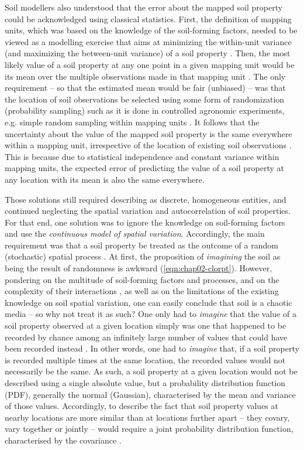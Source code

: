 Soil modellers also understood that the error about the mapped soil property could be acknowledged using 
classical statistics. First, the definition of mapping units, which was based on the knowledge of the 
soil-forming factors, needed to be viewed as a modelling exercise that aims at minimizing the within-unit 
variance (and maximizing the between-unit variance) of a soil property \cite{VoltzEtAl1990}. Then, the most 
likely value of a soil property at any one point in a given mapping unit would be its mean over the multiple 
observations made in that mapping unit \cite{VoltzEtAl1990, Cressie1993}. The only requirement -- so that the 
estimated mean would be fair (unbiased) -- was that the location of soil observations be selected using some 
form of randomization (probability sampling) such as it is done in controlled agronomic experiments, e.g. 
simple random sampling within mapping units \cite{deGruijterEtAl1990}. It follows that the uncertainty about 
the value of the mapped soil property is the same everywhere within a mapping unit, irrespective of the 
location of existing soil observations \cite{Heuvelink1996}. This is because due to statistical independence 
and constant variance within mapping units, the expected error of predicting the value of a soil property at 
any location with its mean is also the same everywhere.

Those solutions still required describing  as discrete, homogeneous entities, and continued 
neglecting the spatial variation and autocorrelation of soil properties. For that end, one solution was to 
ignore the knowledge on soil-forming factors and use the \emph{continuous model of spatial variation}. 
Accordingly, the main requirement was that a soil property be treated as the outcome of a random (stochastic) 
spatial process \cite{Cressie1993, Webster2000}. At first, the proposition of \emph{imagining} the soil as 
being the result of randomness is awkward (\autoref{eqn:chap02-clorpt}). However, pondering on the multitude of 
soil-forming factors and processes, and on the complexity of their interactions \cite{BockheimEtAl2010, 
GrunwaldEtAl2011}, as well as on the limitations of the existing knowledge on soil spatial variation, one can 
easily conclude that soil is a chaotic media \cite{Webster2000} -- so why not treat it as such? One only had to 
\emph{imagine} that the value of a soil property observed at a given location simply was one that happened to 
be recorded by chance among an infinitely large number of values that could have been recorded instead 
\cite{Webster2000}. In other words, one had to \emph{imagine} that, if a soil property is recorded multiple 
times at the same location, the recorded values would not necessarily be the same. As such, a soil property at 
a given location would not be described using a single absolute value, but a probability distribution function 
(PDF), generally the normal (Gaussian), characterised by the mean and variance of those  values. 
Accordingly, to describe the fact that soil property values at nearby locations are more similar than at 
locations further apart -- they covary, vary together or jointly -- would require a joint probability 
distribution function, characterised by the covariance \cite{WebsterEtAl1990, Cressie1993}.

